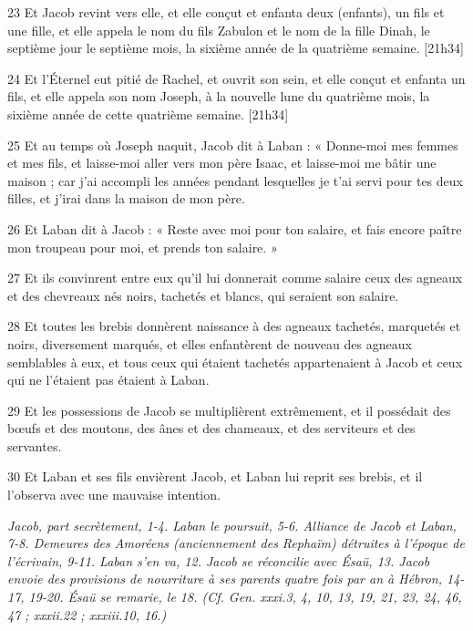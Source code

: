 \par 23 Et Jacob revint vers elle, et elle conçut et enfanta deux (enfants), un fils et une fille, et elle appela le nom du fils Zabulon et le nom de la fille Dinah, le septième jour le septième mois, la sixième année de la quatrième semaine. [21h34]
\par 24 Et l'Éternel eut pitié de Rachel, et ouvrit son sein, et elle conçut et enfanta un fils, et elle appela son nom Joseph, à la nouvelle lune du quatrième mois, la sixième année de cette quatrième semaine. [21h34]
\par 25 Et au temps où Joseph naquit, Jacob dit à Laban : « Donne-moi mes femmes et mes fils, et laisse-moi aller vers mon père Isaac, et laisse-moi me bâtir une maison ; car j'ai accompli les années pendant lesquelles je t'ai servi pour tes deux filles, et j'irai dans la maison de mon père.
\par 26 Et Laban dit à Jacob : « Reste avec moi pour ton salaire, et fais encore paître mon troupeau pour moi, et prends ton salaire. »
\par 27 Et ils convinrent entre eux qu'il lui donnerait comme salaire ceux des agneaux et des chevreaux nés noirs, tachetés et blancs, qui seraient son salaire.
\par 28 Et toutes les brebis donnèrent naissance à des agneaux tachetés, marquetés et noirs, diversement marqués, et elles enfantèrent de nouveau des agneaux semblables à eux, et tous ceux qui étaient tachetés appartenaient à Jacob et ceux qui ne l'étaient pas étaient à Laban.
\par 29 Et les possessions de Jacob se multiplièrent extrêmement, et il possédait des bœufs et des moutons, des ânes et des chameaux, et des serviteurs et des servantes.
\par 30 Et Laban et ses fils envièrent Jacob, et Laban lui reprit ses brebis, et il l'observa avec une mauvaise intention.


\par \textit{Jacob, part secrètement, 1-4. Laban le poursuit, 5-6. Alliance de Jacob et Laban, 7-8. Demeures des Amoréens (anciennement des Rephaïm) détruites à l'époque de l'écrivain, 9-11. Laban s'en va, 12. Jacob se réconcilie avec Ésaü, 13. Jacob envoie des provisions de nourriture à ses parents quatre fois par an à Hébron, 14-17, 19-20. Ésaü se remarie, le 18. (Cf. Gen. xxxi.3, 4, 10, 13, 19, 21, 23, 24, 46, 47 ; xxxii.22 ; xxxiii.10, 16.)}

